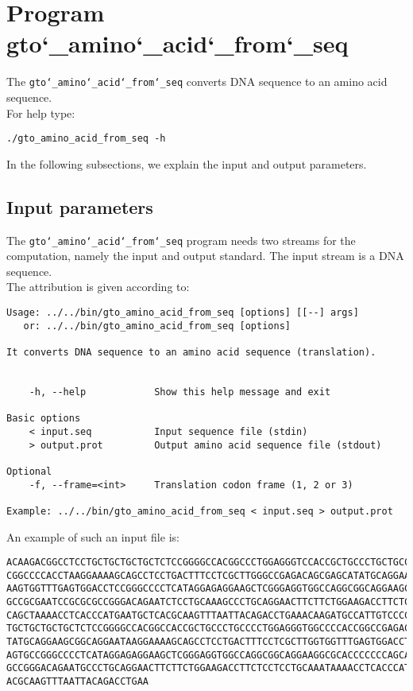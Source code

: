 \section{Program gto\char`_amino\char`_acid\char`_from\char`_seq}
The \texttt{gto\char`_amino\char`_acid\char`_from\char`_seq} converts DNA sequence to an amino acid sequence.\\
For help type:
\begin{lstlisting}
./gto_amino_acid_from_seq -h
\end{lstlisting}

In the following subsections, we explain the input and output parameters.

\subsection*{Input parameters}

The \texttt{gto\char`_amino\char`_acid\char`_from\char`_seq} program needs two streams for the computation, namely the input and output standard. The input stream is a DNA sequence.\\
The attribution is given according to:
\begin{lstlisting}
Usage: ../../bin/gto_amino_acid_from_seq [options] [[--] args]
   or: ../../bin/gto_amino_acid_from_seq [options]

It converts DNA sequence to an amino acid sequence (translation).


    -h, --help            Show this help message and exit

Basic options
    < input.seq           Input sequence file (stdin)
    > output.prot         Output amino acid sequence file (stdout)

Optional
    -f, --frame=<int>     Translation codon frame (1, 2 or 3)

Example: ../../bin/gto_amino_acid_from_seq < input.seq > output.prot
\end{lstlisting}
An example of such an input file is:
\begin{lstlisting}
ACAAGACGGCCTCCTGCTGCTGCTGCTCTCCGGGGCCACGGCCCTGGAGGGTCCACCGCTGCCCTGCTGCCATTGTCCC
CGGCCCCACCTAAGGAAAAGCAGCCTCCTGACTTTCCTCGCTTGGGCCGAGACAGCGAGCATATGCAGGAAGCGGCAGG
AAGTGGTTTGAGTGGACCTCCGGGCCCCTCATAGGAGAGGAAGCTCGGGAGGTGGCCAGGCGGCAGGAAGCAGGCCAGT
GCCGCGAATCCGCGCGCCGGGACAGAATCTCCTGCAAAGCCCTGCAGGAACTTCTTCTGGAAGACCTTCTCCACCCCCC
CAGCTAAAACCTCACCCATGAATGCTCACGCAAGTTTAATTACAGACCTGAAACAAGATGCCATTGTCCCCCGGCCTCC
TGCTGCTGCTGCTCTCCGGGGCCACGGCCACCGCTGCCCTGCCCCTGGAGGGTGGCCCCACCGGCCGAGACAGCGAGCA
TATGCAGGAAGCGGCAGGAATAAGGAAAAGCAGCCTCCTGACTTTCCTCGCTTGGTGGTTTGAGTGGACCTCCCAGGCC
AGTGCCGGGCCCCTCATAGGAGAGGAAGCTCGGGAGGTGGCCAGGCGGCAGGAAGGCGCACCCCCCCAGCAATCCGCGC
GCCGGGACAGAATGCCCTGCAGGAACTTCTTCTGGAAGACCTTCTCCTCCTGCAAATAAAACCTCACCCATGAATGCTC
ACGCAAGTTTAATTACAGACCTGAA
\end{lstlisting}

